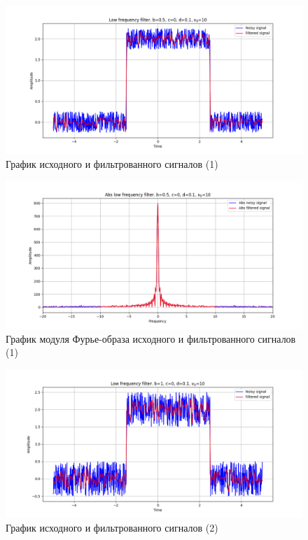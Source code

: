 \documentclass[a4paper, 12pt]{article}
\begin{document}
    \begin{figure}[!htb]
        \centering
        \includegraphics[scale=0.48]{1_u_flt_u_nohigh.png}
        \captionsetup{skip=0pt}
        \caption{График исходного и фильтрованного сигналов (1)}
        \label{fig:fig1}
    \end{figure}
    \begin{figure}[!htb]
        \centering
        \includegraphics[scale=0.48]{1_abs_u_U_nohigh.png}
        \captionsetup{skip=0pt}
        \caption{График модуля Фурье-образа исходного и фильтрованного сигналов (1)}
        \label{fig:fig2}
    \end{figure}
    \begin{figure}[!htb]
        \centering
        \includegraphics[scale=0.48]{2_u_flt_u_nohigh.png}
        \captionsetup{skip=0pt}
        \caption{График исходного и фильтрованного сигналов (2)}
        \label{fig:fig3}
    \end{figure}
\end{document}
